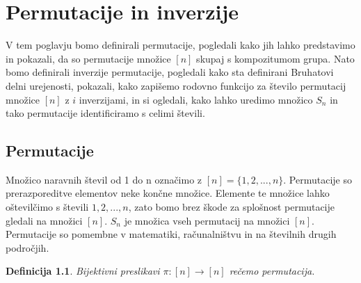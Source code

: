 \documentclass[a4paper, 12pt]{book}
\newtheorem{definicija}{Definicija}[chapter]
\begin{document}
\chapter{ Permutacije in inverzije }

V tem poglavju bomo definirali permutacije, pogledali kako jih lahko predstavimo in pokazali, da so permutacije množice $[n]$ skupaj s kompozitumom grupa. Nato bomo definirali inverzije permutacije, pogledali kako sta definirani Bruhatovi delni urejenosti, pokazali, kako zapišemo rodovno funkcijo za število permutacij množice $[n]$ z $i$ inverzijami, in si ogledali, kako lahko uredimo množico $S_n$ in tako permutacije identificiramo s celimi števili.

\section{ Permutacije }

Množico naravnih števil od 1 do n označimo z $[n] = \{ 1, 2,..., n\}$.
Permutacije so prerazporeditve elementov neke končne množice. Elemente te množice lahko oštevilčimo s števili $1, 2, ..., n$, zato bomo brez škode za splošnost permutacije gledali na množici $[n]$. 
$S_n$ je množica vseh permutacij na množici $[n]$.
Permutacije so pomembne v matematiki, računalništvu in na številnih drugih področjih. 



\begin{definicija}
Bijektivni preslikavi $\pi: [n] \rightarrow [n]$ rečemo permutacija.
\end{definicija}
\end{document}
